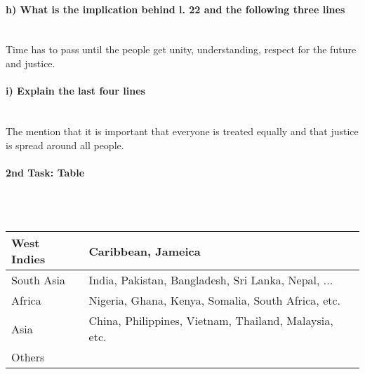 \documentclass[12pt,a4paper]{report}
\begin{document}
	\paragraph{h) What is the implication behind l. 22 and the following three lines} \mbox{} \\
	Time has to pass until the people get unity, understanding, respect for the future and justice.
	\paragraph{i) Explain the last four lines} \mbox{} \\
	The mention that it is important that everyone is treated equally and that justice is spread around all people.
	\paragraph{2nd Task: Table} \mbox{} \\\\
	\begin{tabularx}{\linewidth}{|X|X|}
		\hline
		West Indies & Caribbean, Jameica \\
		\hline
		South Asia & India, Pakistan, Bangladesh, Sri Lanka, Nepal, ... \\
		\hline
		Africa & Nigeria, Ghana, Kenya, Somalia, South Africa, etc. \\
		\hline
		Asia & China, Philippines, Vietnam, Thailand, Malaysia, etc. \\
		\hline
		Others &  \\
		\hline
	\end{tabularx}
\end{document}
